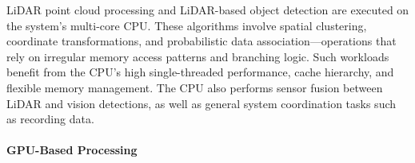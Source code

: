 
LiDAR point cloud processing and LiDAR-based object detection are executed on the system’s multi-core CPU.
These algorithms involve spatial clustering, coordinate transformations, and probabilistic data association—operations that rely on irregular memory access patterns and branching logic.
Such workloads benefit from the CPU’s high single-threaded performance, cache hierarchy, and flexible memory management.
The CPU also performs sensor fusion between LiDAR and vision detections, as well as general system coordination tasks such as recording data. %

\paragraph{GPU-Based Processing}




